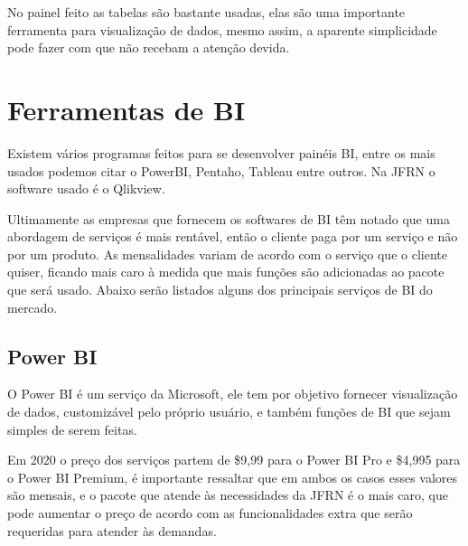 No painel feito as tabelas são bastante usadas, elas são uma importante ferramenta para visualização de dados, mesmo assim, a aparente simplicidade pode fazer com que não recebam a atenção devida. 
\section{Ferramentas de BI}

Existem vários programas feitos para se desenvolver painéis BI, entre os mais usados podemos citar o PowerBI, Pentaho, Tableau entre outros. Na JFRN o software usado é o Qlikview. 

Ultimamente as empresas que fornecem os softwares de BI têm notado que uma abordagem de serviços é mais rentável, então o cliente paga por um serviço e não por um produto. As mensalidades variam de acordo com o serviço que o cliente quiser, ficando mais caro à medida que mais funções são adicionadas ao pacote que será usado. Abaixo serão listados alguns dos principais serviços de BI do mercado.

\subsection{Power BI}

O Power BI é um serviço da Microsoft, ele tem por objetivo fornecer visualização de dados, customizável pelo próprio usuário, e também funções de BI que sejam simples de serem feitas. 

Em 2020 o preço dos serviços partem de \$9,99 para o Power BI Pro e \$4,995 para o Power BI Premium, é importante ressaltar que em ambos os casos esses valores são mensais, e o pacote que atende às necessidades da JFRN é o mais caro, que pode aumentar o preço de acordo com as funcionalidades extra que serão requeridas para atender às demandas.

